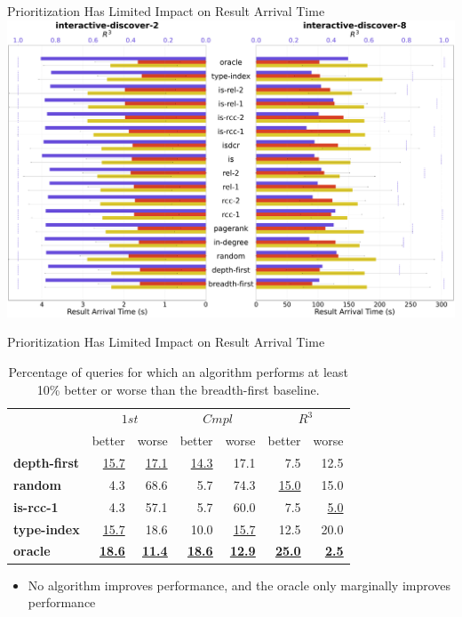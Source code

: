 \begin{frame}{Prioritization Has Limited Impact on Result Arrival Time}
    \centering
    \includegraphics[width=.82\linewidth]{images/combined_r3_timings_plot_non_relative_reduced_test.pdf} %
\end{frame}


\begin{frame}{Prioritization Has Limited Impact on Result Arrival Time}
  \small %
  \captionsetup[table]{skip=10pt, font=footnotesize }
  \begin{table}[!ht]
    \centering
    \begin{adjustbox}{width=0.9\textwidth} %
      \begin{tabular}{l|rr|rr|rr}
        & \multicolumn{2}{c}{$1st$} & \multicolumn{2}{c}{$Cmpl$} & \multicolumn{2}{c}{$R^{3}$} \\
        & better & worse & better & worse & better & worse  \\
        \midrule
        \bf depth-first & \underline{15.7} & \underline{17.1} & \underline{14.3} & 17.1 & 7.5 & 12.5  \\
        \bf random & 4.3 & 68.6 & 5.7 & 74.3 & \underline{15.0} & 15.0 \\
        \hline
        \bf is-rcc-1 & 4.3 & 57.1 & 5.7 & 60.0 & 7.5 & \underline{5.0} \\
        \hline
        \bf type-index & \underline{15.7} & 18.6 & 10.0 & \underline{15.7} & 12.5 & 20.0 \\
        \hline
        \bf oracle & \underline{\underline{\textbf{18.6}}} & \underline{\underline{\textbf{11.4}}} 
        & \underline{\underline{\textbf{18.6}}} & \underline{\underline{\textbf{12.9}}} 
        & \underline{\underline{\textbf{25.0}}} & \underline{\underline{\textbf{2.5}}} \\
      \end{tabular}
    \end{adjustbox}
    \caption{Percentage of queries for which an algorithm performs at least 10\% better or worse than the breadth-first baseline.}
  \end{table}
  \begin{itemize}
    \item No algorithm improves performance, and the oracle only marginally improves performance
  \end{itemize}
\end{frame}